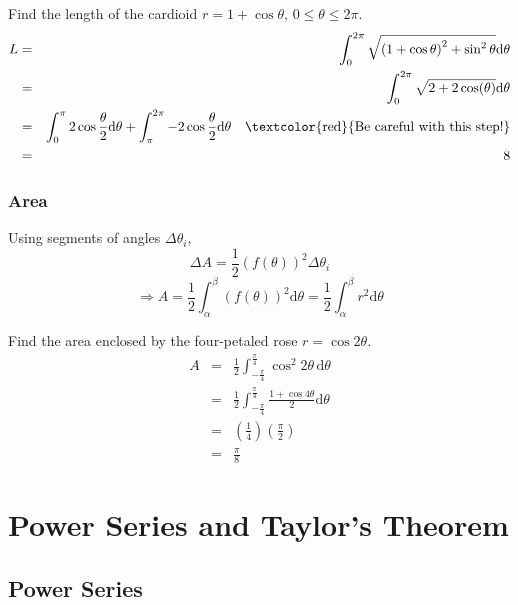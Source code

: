 \documentclass[12pt]{report}
\theoremstyle{definition}
\begin{document}
\begin{ex}
    Find the length of the cardioid $r = 1 + \cos{\theta}$, $0 \le \theta \le 2\pi$.
    \begin{eqnarray*}
        L &=& \int_0^{2\pi}\sqrt{{\left(1+\cos{\theta}\right)}^{2} + \sin^{2}\theta} \mathrm{d}\theta \\
          &=& \int_0^{2\pi} \sqrt{2 + 2\cos(\theta)} \mathrm{d}\theta \\
          &=& \int_0^{\pi} 2\cos{\frac{\theta}{2}}\mathrm{d}\theta
          + \int_\pi^{2\pi} -2\cos{\frac{\theta}{2}}\mathrm{d}\theta \quad
          \text{\textcolor{red}{Be careful with this step!}} \\
          &=& 8
    \end{eqnarray*}
\end{ex}

\subsection{Area}
Using segments of angles $\Delta \theta_i$,\[
    \Delta A = \frac{1}{2} {\left(f(\theta)\right)}^{2} \Delta \theta_i
\]\[
\Rightarrow A = \frac{1}{2}\int_\alpha^{\beta} {\left(f(\theta)\right)}^{2}\mathrm{d}\theta 
= \frac{1}{2}\int_\alpha^{\beta} r^{2}\mathrm{d}\theta
\]
\begin{ex}
    Find the area enclosed by the four-petaled rose $r = \cos{2\theta}$.
    \begin{eqnarray*}
        A &=& \frac{1}{2}\int_{-\frac{\pi}{4}}^{\frac{\pi}{4}} \cos^{2}{2\theta}\,\mathrm{d}\theta \\
          &=& \frac{1}{2}\int_{-\frac{\pi}{4}}^{\frac{\pi}{4}} \frac{1+\cos{4\theta}}{2}\mathrm{d}\theta \\
          &=& \left(\frac{1}{4}\right)\left(\frac{\pi}{2}\right) \\
          &=& \frac{\pi}{8}
    \end{eqnarray*}
    
\end{ex}

\chapter{Power Series and Taylor's Theorem}
\section{Power Series}
\end{document}
